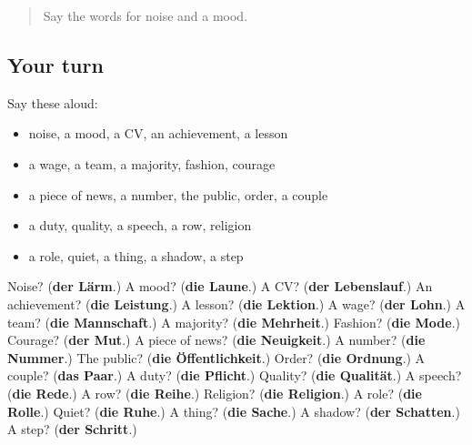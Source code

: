 \begin{quote}
Say the words for noise and a mood.
\end{quote}

\subsection*{Your turn}
Say these aloud:

\begin{itemize}
\raggedright
  \item noise, a mood, a CV, an achievement, a lesson
  \item a wage, a team, a majority, fashion, courage
  \item a piece of news, a number, the public, order, a couple
  \item a duty, quality, a speech, a row, religion
  \item a role, quiet, a thing, a shadow, a step
\end{itemize}

\begin{tcolorbox}[breakable,colback=teal!4,colframe=teal!35!black,title={Before you move on}]
Noise? (\textbf{der Lärm}.) A mood? (\textbf{die Laune}.) A CV? (\textbf{der Lebenslauf}.) An achievement? (\textbf{die Leistung}.) A lesson? (\textbf{die Lektion}.) A wage? (\textbf{der Lohn}.) A team? (\textbf{die Mannschaft}.) A majority? (\textbf{die Mehrheit}.) Fashion? (\textbf{die Mode}.) Courage? (\textbf{der Mut}.) A piece of news? (\textbf{die Neuigkeit}.) A number? (\textbf{die Nummer}.) The public? (\textbf{die Öffentlichkeit}.) Order? (\textbf{die Ordnung}.) A couple? (\textbf{das Paar}.) A duty? (\textbf{die Pflicht}.) Quality? (\textbf{die Qualität}.) A speech? (\textbf{die Rede}.) A row? (\textbf{die Reihe}.) Religion? (\textbf{die Religion}.) A role? (\textbf{die Rolle}.) Quiet? (\textbf{die Ruhe}.) A thing? (\textbf{die Sache}.) A shadow? (\textbf{der Schatten}.) A step? (\textbf{der Schritt}.)
\end{tcolorbox}
